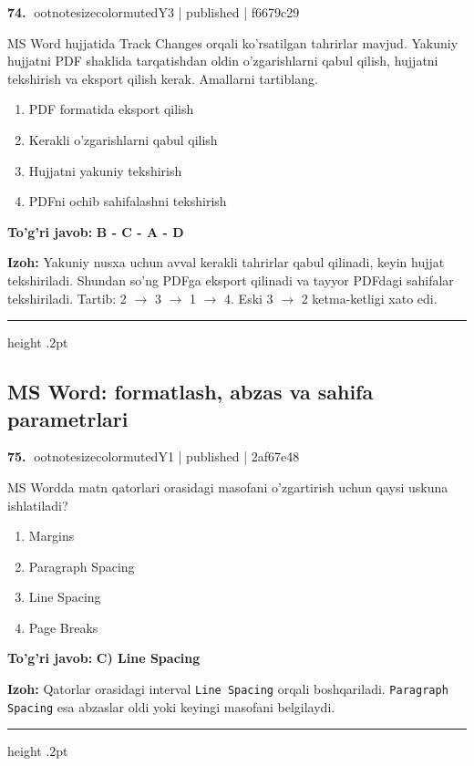 \documentclass[10pt,a4paper]{article}
\begin{document}
\textbf{\color{ink}74.} {ootnotesizecolor{muted}Y3 | published | f6679c29}
\par
MS Word hujjatida Track Changes orqali ko'rsatilgan tahrirlar mavjud. Yakuniy hujjatni PDF shaklida tarqatishdan oldin o'zgarishlarni qabul qilish, hujjatni tekshirish va eksport qilish kerak. Amallarni tartiblang.
\begin{enumerate}[label=\Alph*),leftmargin=9mm]
\item PDF formatida eksport qilish
\item Kerakli o'zgarishlarni qabul qilish
\item Hujjatni yakuniy tekshirish
\item PDFni ochib sahifalashni tekshirish
\end{enumerate}
\begin{tcolorbox}[enhanced,breakable,colback=teal!4,colframe=teal!55!black,boxrule=0.45pt,arc=1.2mm,left=2.8mm,right=2.8mm,top=2mm,bottom=2mm]
\textbf{\color{teal}To'g'ri javob:} \textbf{B - C - A - D}
\par\smallskip
\textbf{Izoh:} Yakuniy nusxa uchun avval kerakli tahrirlar qabul qilinadi, keyin hujjat tekshiriladi. Shundan so'ng PDFga eksport qilinadi va tayyor PDFdagi sahifalar tekshiriladi. Tartib: 2 \ensuremath{\rightarrow} 3 \ensuremath{\rightarrow} 1 \ensuremath{\rightarrow} 4. Eski 3 \ensuremath{\rightarrow} 2 ketma-ketligi xato edi.
\end{tcolorbox}
\vspace{2mm}\hrule height .2pt\vspace{2mm}
\subsection{MS Word: formatlash, abzas va sahifa parametrlari}

\textbf{\color{ink}75.} {ootnotesizecolor{muted}Y1 | published | 2af67e48}
\par
MS Wordda matn qatorlari orasidagi masofani o'zgartirish uchun qaysi uskuna ishlatiladi?
\begin{enumerate}[label=\Alph*),leftmargin=9mm]
\item Margins
\item Paragraph Spacing
\item Line Spacing
\item Page Breaks
\end{enumerate}
\begin{tcolorbox}[enhanced,breakable,colback=teal!4,colframe=teal!55!black,boxrule=0.45pt,arc=1.2mm,left=2.8mm,right=2.8mm,top=2mm,bottom=2mm]
\textbf{\color{teal}To'g'ri javob:} \textbf{C) Line Spacing}
\par\smallskip
\textbf{Izoh:} Qatorlar orasidagi interval \texttt{Line Spacing} orqali boshqariladi. \texttt{Paragraph Spacing} esa abzaslar oldi yoki keyingi masofani belgilaydi.
\end{tcolorbox}
\vspace{2mm}\hrule height .2pt\vspace{2mm}
\end{document}
